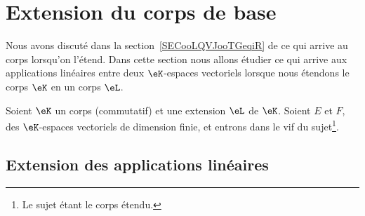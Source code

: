 
\section{Extension du corps de base}
\label{SECooAUOWooNdYTZf}

Nous avons discuté dans la section~\ref{SECooLQVJooTGeqiR} de ce qui arrive au corps lorsqu'on l'étend. Dans cette section nous allons étudier ce qui arrive aux applications linéaires entre deux \( \eK\)-espaces vectoriels lorsque nous étendons le corps \( \eK\) en un corps \( \eL\).

Soient \( \eK\) un corps (commutatif) et une extension \( \eL\) de \( \eK\). Soient \( E\) et \( F\), des \( \eK\)-espaces vectoriels de dimension finie, et entrons dans le vif du sujet\footnote{Le sujet étant le corps étendu.}.

\subsection{Extension des applications linéaires}

